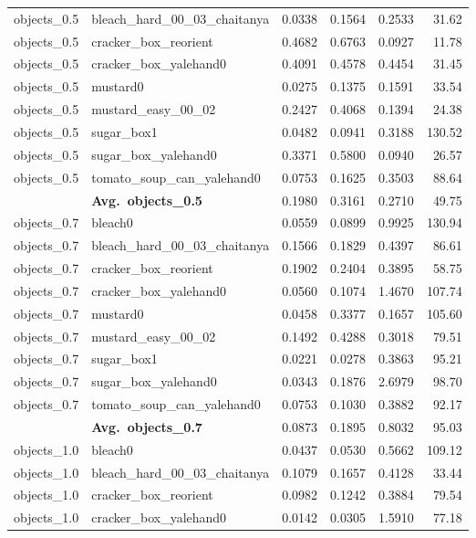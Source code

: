 \begin{longtable}{llrrrr}
  objects_0.5 & bleach\_hard\_00\_03\_chaitanya & 0.0338 & 0.1564 & 0.2533 & 31.62 \\
  objects_0.5 & cracker\_box\_reorient & 0.4682 & 0.6763 & 0.0927 & 11.78 \\
  objects_0.5 & cracker\_box\_yalehand0 & 0.4091 & 0.4578 & 0.4454 & 31.45 \\
  objects_0.5 & mustard0 & 0.0275 & 0.1375 & 0.1591 & 33.54 \\
  objects_0.5 & mustard\_easy\_00\_02 & 0.2427 & 0.4068 & 0.1394 & 24.38 \\
  objects_0.5 & sugar\_box1 & 0.0482 & 0.0941 & 0.3188 & 130.52 \\
  objects_0.5 & sugar\_box\_yalehand0 & 0.3371 & 0.5800 & 0.0940 & 26.57 \\
  objects_0.5 & tomato\_soup\_can\_yalehand0 & 0.0753 & 0.1625 & 0.3503 & 88.64 \\
  \cmidrule{2-6}
  & \textbf{Avg.~objects_0.5} & 0.1980 & 0.3161 & 0.2710 & 49.75 \\
  \midrule
  objects_0.7 & bleach0 & 0.0559 & 0.0899 & 0.9925 & 130.94 \\
  objects_0.7 & bleach\_hard\_00\_03\_chaitanya & 0.1566 & 0.1829 & 0.4397 & 86.61 \\
  objects_0.7 & cracker\_box\_reorient & 0.1902 & 0.2404 & 0.3895 & 58.75 \\
  objects_0.7 & cracker\_box\_yalehand0 & 0.0560 & 0.1074 & 1.4670 & 107.74 \\
  objects_0.7 & mustard0 & 0.0458 & 0.3377 & 0.1657 & 105.60 \\
  objects_0.7 & mustard\_easy\_00\_02 & 0.1492 & 0.4288 & 0.3018 & 79.51 \\
  objects_0.7 & sugar\_box1 & 0.0221 & 0.0278 & 0.3863 & 95.21 \\
  objects_0.7 & sugar\_box\_yalehand0 & 0.0343 & 0.1876 & 2.6979 & 98.70 \\
  objects_0.7 & tomato\_soup\_can\_yalehand0 & 0.0753 & 0.1030 & 0.3882 & 92.17 \\
  \cmidrule{2-6}
  & \textbf{Avg.~objects_0.7} & 0.0873 & 0.1895 & 0.8032 & 95.03 \\
  \midrule
  objects_1.0 & bleach0 & 0.0437 & 0.0530 & 0.5662 & 109.12 \\
  objects_1.0 & bleach\_hard\_00\_03\_chaitanya & 0.1079 & 0.1657 & 0.4128 & 33.44 \\
  objects_1.0 & cracker\_box\_reorient & 0.0982 & 0.1242 & 0.3884 & 79.54 \\
  objects_1.0 & cracker\_box\_yalehand0 & 0.0142 & 0.0305 & 1.5910 & 77.18 \\

\end{longtable}
